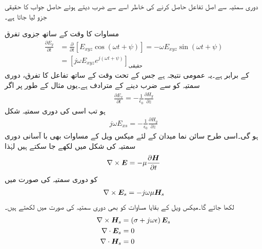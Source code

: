دوری سمتیہ سے اصل تفاعل حاصل کرنے کی خاطر اسے  سے ضرب دیتے ہوئے حاصل جواب کا حقیقی جزو لیا جاتا ہے۔

مساوات  کا وقت کے ساتھ جزوی تفرق
\begin{align*}
\frac{\partial E_y}{\partial t}&=\frac{\partial }{\partial t} [E_{xyz} \cos(\omega t +\psi)]=-\omega E_{xyz} \sin (\omega t +\psi)\\
&=\left[j \omega  E_{xyz} e^{j(\omega t +\psi)} \right]_{\textrm{حقیقی}}
\end{align*} 
کے برابر ہے۔یہ عمومی نتیجہ ہے جس کے تحت وقت کے ساتھ تفاعل کا تفرق، دوری سمتیہ کو  سے ضرب دینے کے مترادف ہے۔یوں مثال کے طور پر اگر
\begin{align*}
\frac{\partial E_x}{\partial t}=-\frac{1}{\epsilon_0} \frac{\partial H_y}{\partial z}
\end{align*}
ہو تب اسی کی دوری سمتیہ شکل
\begin{align*}
j \omega E_{xs}=-\frac{1}{\epsilon_0} \frac{\partial H_y}{\partial z}
\end{align*}
ہو گی۔اسی طرح سائن نما میدان کے لئے میکس ویل کے مساوات بھی با آسانی دوری سمتیہ کی شکل میں لکھے جا سکتے ہیں لہٰذا
\begin{align*}
\nabla \times {\ensuremath{{\boldsymbol{E}}}}=-\mu\frac{\partial {\ensuremath{{\boldsymbol{H}}}}}{\partial t}
\end{align*} 
کو دوری سمتیہ کی صورت میں
\begin{align}   \label{مساوات_موج_میکس_ویل_دوری_سمتیہ_شکل_الف}
\nabla \times {\ensuremath{{\boldsymbol{E}}}}_s=-j \omega \mu {\ensuremath{{\boldsymbol{H}}}}_s
\end{align}
لکھا جائے گا۔میکس ویل کے بقایا مساوات کو بھی دوری سمتیہ کی صورت میں لکھتے ہیں۔
\begin{align}
\nabla \times {\ensuremath{{\boldsymbol{H}}}}_s &=\left(\sigma +j \omega \epsilon \right) {{\boldsymbol{E}}}_s   \label{مساوات_موج_میکس_ویل_دوری_سمتیہ_شکل_ب}\\
\nabla \cdot {\ensuremath{{\boldsymbol{E}}}}_s &=0   \label{مساوات_موج_میکس_ویل_دوری_سمتیہ_شکل_پ}\\
\nabla \cdot {\ensuremath{{\boldsymbol{H}}}}_s&=0   \label{مساوات_موج_میکس_ویل_دوری_سمتیہ_شکل_ت}
\end{align}

